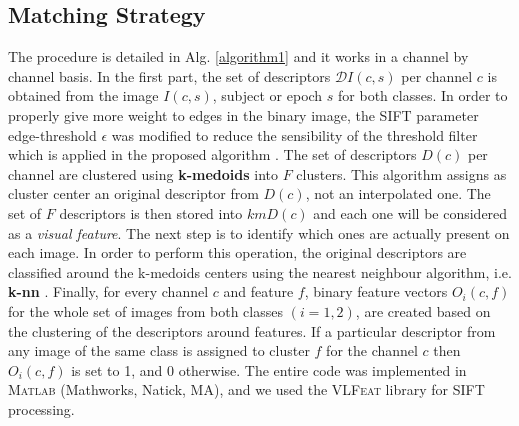 \documentclass[nouppercase]{ifmbe}
\begin{document}
     
\subsection{Matching Strategy}   


The procedure is detailed in Alg. \ref{algorithm1} and it works in a channel by channel basis.  In the first part, the set of descriptors  $ \mathcal{D} I(c,s) $ per channel $ c $ is obtained from the image $I(c,s)$, subject or epoch $ s $ for both classes.  In order to properly give more weight to edges in the binary image, the SIFT parameter edge-threshold $\epsilon$ was modified to reduce the sensibility of the threshold filter which is applied in the proposed algorithm \cite{c14}. The set of descriptors $ D(c) $ per channel are clustered using \textbf{k-medoids} \cite{c20} into $ F $ clusters.  This algorithm assigns as cluster center an original descriptor from $ D(c) $, not an interpolated one. The set of $ F $ descriptors is then stored into $ kmD(c) $ and each one will be considered as a \textit{visual feature}. The next step is to identify which ones are actually present on each image.  In order to perform this operation, the original descriptors are classified around the k-medoids centers using the nearest neighbour algorithm, i.e. \textbf{k-nn} \cite{c9}.   Finally, for every channel $ c $ and feature $ f $, binary feature vectors $O_i(c,f)$ for the whole set of images from both classes $(i=1,2)$, are created based on the clustering of the descriptors around features.  If a particular descriptor from any image of the same class is assigned to cluster $ f $ for the channel $ c $  then $ O_i(c,f) $ is set to 1, and 0 otherwise. The entire code was implemented in  \textsc{Matlab} (Mathworks, Natick, MA), and we used the \textsc{VLFeat} library \cite{c16} for SIFT processing.

\end{document}

